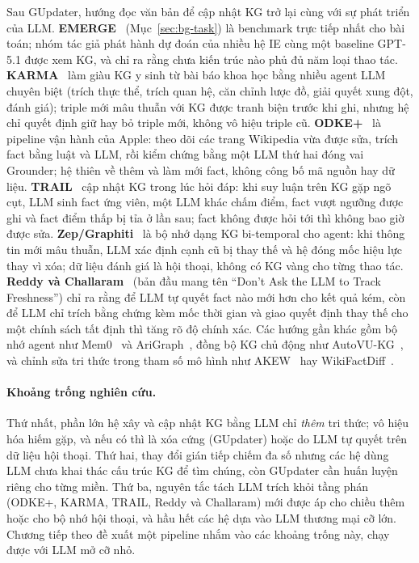 Sau GUpdater, hướng đọc văn bản để cập nhật KG trở lại cùng với sự phát triển của LLM.
\textbf{EMERGE}~\cite{zaporojets2025emerge} (Mục~\ref{sec:bg-task}) là benchmark trực tiếp nhất cho bài toán; nhóm tác giả phát hành dự đoán của nhiều hệ IE cùng một baseline GPT-5.1 được xem KG, và chỉ ra rằng chưa kiến trúc nào phủ đủ năm loại thao tác.
\textbf{KARMA}~\cite{lu2025karma} làm giàu KG y sinh từ bài báo khoa học bằng nhiều agent LLM chuyên biệt (trích thực thể, trích quan hệ, căn chỉnh lược đồ, giải quyết xung đột, đánh giá); triple mới mâu thuẫn với KG được tranh biện trước khi ghi, nhưng hệ chỉ quyết định giữ hay bỏ triple mới, không vô hiệu triple cũ.
\textbf{ODKE+}~\cite{odke2025} là pipeline vận hành của Apple: theo dõi các trang Wikipedia vừa được sửa, trích fact bằng luật và LLM, rồi kiểm chứng bằng một LLM thứ hai đóng vai Grounder; hệ thiên về thêm và làm mới fact, không công bố mã nguồn hay dữ liệu.
\textbf{TRAIL}~\cite{trail2026} cập nhật KG trong lúc hỏi đáp: khi suy luận trên KG gặp ngõ cụt, LLM sinh fact ứng viên, một LLM khác chấm điểm, fact vượt ngưỡng được ghi và fact điểm thấp bị tỉa ở lần sau; fact không được hỏi tới thì không bao giờ được sửa.
\textbf{Zep/Graphiti}~\cite{rasmussen2025zep} là bộ nhớ dạng KG bi-temporal cho agent: khi thông tin mới mâu thuẫn, LLM xác định cạnh cũ bị thay thế và hệ đóng mốc hiệu lực thay vì xóa; dữ liệu đánh giá là hội thoại, không có KG vàng cho từng thao tác.
\textbf{Reddy và Challaram}~\cite{freshness2026} (bản đầu mang tên ``Don't Ask the LLM to Track Freshness'') chỉ ra rằng để LLM tự quyết fact nào mới hơn cho kết quả kém, còn để LLM chỉ trích bằng chứng kèm mốc thời gian và giao quyết định thay thế cho một chính sách tất định thì tăng rõ độ chính xác.
Các hướng gần khác gồm bộ nhớ agent như Mem0~\cite{chhikara2025mem0} và AriGraph~\cite{arigraph2024}, đồng bộ KG chủ động như AutoVU-KG~\cite{autovu2025}, và chỉnh sửa tri thức trong tham số mô hình như AKEW~\cite{akew2024} hay WikiFactDiff~\cite{wikifactdiff2024}.

\paragraph*{Khoảng trống nghiên cứu.}
Thứ nhất, phần lớn hệ xây và cập nhật KG bằng LLM chỉ \emph{thêm} tri thức; vô hiệu hóa hiếm gặp, và nếu có thì là xóa cứng (GUpdater) hoặc do LLM tự quyết trên dữ liệu hội thoại.
Thứ hai, thay đổi gián tiếp chiếm đa số nhưng các hệ dùng LLM chưa khai thác cấu trúc KG để tìm chúng, còn GUpdater cần huấn luyện riêng cho từng miền.
Thứ ba, nguyên tắc tách LLM trích khỏi tầng phán (ODKE+, KARMA, TRAIL, Reddy và Challaram) mới được áp cho chiều thêm hoặc cho bộ nhớ hội thoại, và hầu hết các hệ dựa vào LLM thương mại cỡ lớn.
Chương tiếp theo đề xuất một pipeline nhắm vào các khoảng trống này, chạy được với LLM mở cỡ nhỏ.

